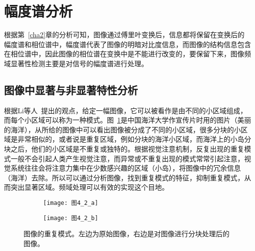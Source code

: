 \section{幅度谱分析}
\label{4_1}

根据第~\ref{cha2}章的分析可知，图像通过傅里叶变换后，信息都将保留在变换后的幅度谱和相位谱中，幅度谱代表了图像的明暗对比度信息，而图像的结构信息包含在相位谱中，因此图像的相位谱在变换中是不能进行改变的，要保留下来，图像频域显著性检测主要是对信号的幅度谱进行处理。

\subsection{图像中显著与非显著特性分析}
\label{4_1_1}

根据Li等人~\cite{LiJianTPAMI2013Scale}提出的观点，给定一幅图像，它可以被看作是由不同的小区域组成，而每个小区域可以称为一种模式。图~\ref{图4_2}是中国海洋大学作宣传片时用的图片（美丽的海洋），从所给的图像中可以看出图像被分成了不同的小区域，很多分块的小区域是非常相似的，或者说是重复区域，例如分块的海洋小区域，而海洋上的小岛分块之后，他们的小区域是不重复或独特的。根据视觉注意机制，反复出现的重复模式一般不会引起人类产生视觉注意，而异常或不重复出现的模式常常引起注意，视觉系统往往会将注意力集中在少数感兴趣的区域（小岛），将图像中的冗余信息（海洋）去除。所以可以通过分析图像，找到重复模式的特征，抑制重复模式，从而突出显著区域。频域处理可以有效的实现这个目地。
\begin{figure}[h]
  \centering%
  \begin{subfigure}{0.38\textwidth}
    \texttt{[image: 图4\_2\_a]}
  \end{subfigure}
  \hspace{4em}%
  \begin{subfigure}{0.45\textwidth}
    \texttt{[image: 图4\_2\_b]}
  \end{subfigure}
  \caption{图像的重复模式。左边为原始图像，右边是对图像进行分块处理后的图像。}
  \label{图4_2}
\end{figure}

